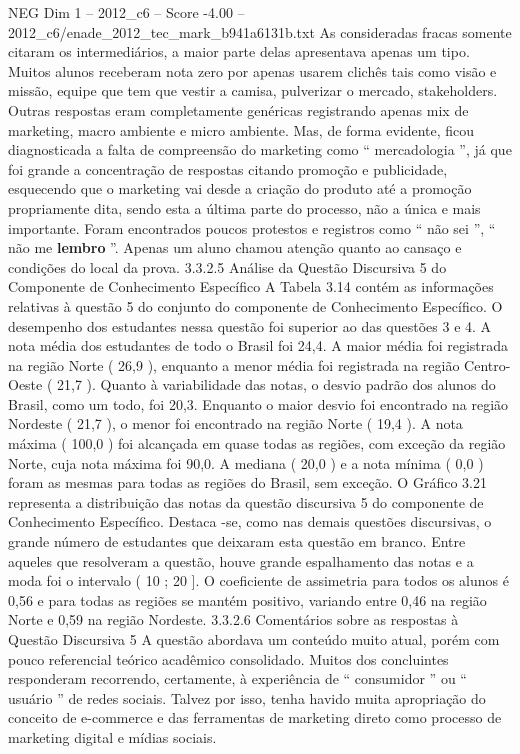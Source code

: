 \begin{textsample}{NEG Dim 1 – 2012\_c6 – Score -4.00 – 2012\_c6/enade\_2012\_tec\_mark\_b941a6131b.txt}
As consideradas fracas somente citaram os intermediários, a maior parte delas apresentava apenas um tipo.
Muitos alunos receberam nota zero por apenas usarem clichês tais como visão e missão, equipe que tem que vestir a camisa, pulverizar o mercado, stakeholders.
Outras respostas eram completamente genéricas registrando apenas mix de marketing, macro ambiente e micro ambiente.
Mas, de forma evidente, ficou diagnosticada a falta de compreensão do marketing como “ mercadologia ”, já que foi grande a concentração de respostas citando promoção e publicidade, esquecendo que o marketing vai desde a criação do produto até a promoção propriamente dita, sendo esta a última parte do processo, não a única e mais importante.
Foram encontrados poucos protestos e registros como “ não sei ”, “ não me \textbf{lembro} ”.
Apenas um aluno chamou atenção quanto ao cansaço e condições do local da prova. 3.3.2.5 Análise da Questão Discursiva 5 do Componente de Conhecimento Específico A Tabela 3.14 contém as informações relativas à questão 5 do conjunto do componente de Conhecimento Específico.
O desempenho dos estudantes nessa questão foi superior ao das questões 3 e 4.
A nota média dos estudantes de todo o Brasil foi 24,4.
A maior média foi registrada na região Norte ( 26,9 ), enquanto a menor média foi registrada na região Centro-Oeste ( 21,7 ).
Quanto à variabilidade das notas, o desvio padrão dos alunos do Brasil, como um todo, foi 20,3.
Enquanto o maior desvio foi encontrado na região Nordeste ( 21,7 ), o menor foi encontrado na região Norte ( 19,4 ).
A nota máxima ( 100,0 ) foi alcançada em quase todas as regiões, com exceção da região Norte, cuja nota máxima foi 90,0.
A mediana ( 20,0 ) e a nota mínima ( 0,0 ) foram as mesmas para todas as regiões do Brasil, sem exceção.
O Gráfico 3.21 representa a distribuição das notas da questão discursiva 5 do componente de Conhecimento Específico.
Destaca -se, como nas demais questões discursivas, o grande número de estudantes que deixaram esta questão em branco.
Entre aqueles que resolveram a questão, houve grande espalhamento das notas e a moda foi o intervalo ( 10 ; 20 ].
O coeficiente de assimetria para todos os alunos é 0,56 e para todas as regiões se mantém positivo, variando entre 0,46 na região Norte e 0,59 na região Nordeste. 3.3.2.6 Comentários sobre as respostas à Questão Discursiva 5 A questão abordava um conteúdo muito atual, porém com pouco referencial teórico acadêmico consolidado.
Muitos dos concluintes responderam recorrendo, certamente, à experiência de “ consumidor ” ou “ usuário ” de redes sociais.
Talvez por isso, tenha havido muita apropriação do conceito de e-commerce e das ferramentas de marketing direto como processo de marketing digital e mídias sociais.

\end{textsample}
